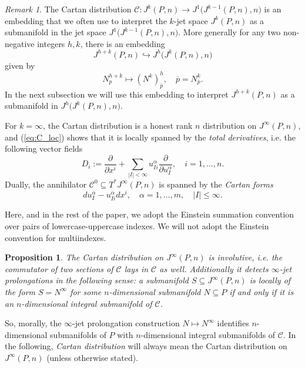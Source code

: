 \documentclass{conm-p-l}
\newtheorem{proposition}[theorem]{Proposition}
\theoremstyle{definition}
\theoremstyle{remark}
\newtheorem{remark}[theorem]{Remark}
\numberwithin{equation}{section}
\begin{document}
\begin{remark}\label{rem:J^k+h}
The Cartan distribution $\mathscr C : J^k (P, n) \longrightarrow J^1 \big(J^{k-1} (P, n), n\big)$ is an embedding that we often use to interpret the $k$-jet space $J^k (P, n)$ as a submanifold in the jet space $J^1 \big(J^{k-1} (P, n), n\big)$. More generally for any two non-negative integers $h, k$, there is an embedding
\[
J^{h+k} (P, n) \hookrightarrow J^h \big(J^{k} (P, n), n\big)
\]
given by
\[
N^{h+k}_p \mapsto (N^k)^h_{\overline p}, \quad \overline p = N^k_p.
\]
In the next subsection we will use this embedding to interpret $J^{h+k} (P, n)$ as a submanifold in $J^h \big(J^{k} (P, n), n\big)$.
\end{remark}

For $k = \infty$, the Cartan distribution is a honest rank $n$ distribution on $J^\infty (P, n)$, and (\ref{eq:C_loc}) shows that it is locally spanned by the \emph{total derivatives}, i.e.{} the following vector fields
\[
D_i := \frac{\partial}{\partial x^i} + \sum_{|I| < \infty} u^\alpha_{Ii} \frac{\partial}{\partial u^\alpha_I}, \quad i = 1, \ldots, n.
\]
Dually, the annihilator $\mathscr C^0 \subseteq T^\ast J^\infty (P, n)$ is spanned by the \emph{Cartan forms}
\[
du^\alpha_I - u^\alpha_{Ii}dx^i, \quad \alpha = 1, \ldots, m, \quad |I| \leq \infty.
\]
 
Here, and in the rest of the paper, we adopt the Einstein summation convention over pairs of lowercase-uppercase indexes. We will not adopt the Einstein convention for multiindexes.
  

\begin{proposition}
The Cartan distribution on $J^\infty (P, n)$ is involutive, i.e.{} the commutator of two sections of $\mathscr C$ lays in $\mathscr C$ as well. Additionally it detects $\infty$-jet prolongations in the following sense: a submanifold $S \subseteq J^\infty (P, n)$ is locally of the form  $S = N^\infty$ for some $n$-dimensional submanifold $N \subseteq P$ if and only if it is an $n$-dimensional integral submanifold of $\mathscr C$. 
\end{proposition}


So, morally, the $\infty$-jet prolongation construction $N \mapsto N^\infty$ identifies $n$-dimensional submanifolds of $P$ with $n$-dimensional integral submanifolds of $\mathscr C$. In the following, \emph{Cartan distribution} will always mean the Cartan distribution on $J^\infty (P, n)$ (unless otherwise stated).
\end{document}
